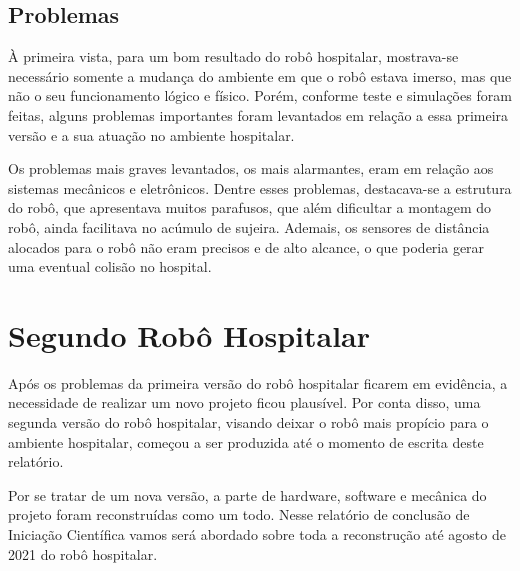\documentclass[../poliXuniversity_hospital_-USP-report.tex]{subfiles}
\begin{document}
\subsection{Problemas}

À primeira vista, para um bom resultado do robô hospitalar, mostrava-se necessário somente a mudança do ambiente em que o robô estava imerso, mas que não o seu funcionamento lógico e físico. Porém, conforme teste e simulações foram feitas, alguns problemas importantes foram levantados em relação a essa primeira versão e a sua atuação no ambiente hospitalar.

Os problemas mais graves levantados, os mais alarmantes, eram em relação aos sistemas mecânicos e eletrônicos. Dentre esses problemas, destacava-se a estrutura do robô, que apresentava muitos parafusos, que além dificultar a montagem do robô, ainda facilitava no acúmulo de sujeira. Ademais, os sensores de distância alocados para o robô não eram precisos e de alto alcance, o que poderia gerar uma eventual colisão no hospital.

\section{Segundo Robô Hospitalar}

Após os problemas da primeira versão do robô hospitalar ficarem em evidência, a necessidade de realizar um novo projeto ficou plausível. Por conta disso, uma segunda versão do robô hospitalar, visando deixar o robô mais propício para o ambiente hospitalar, começou a ser produzida até o momento de escrita deste relatório. 

Por se tratar de um nova versão, a parte de hardware, software e mecânica do projeto foram reconstruídas como um todo. Nesse relatório de conclusão de Iniciação Científica vamos será abordado sobre toda a reconstrução até agosto de 2021 do robô hospitalar.
\end{document}

